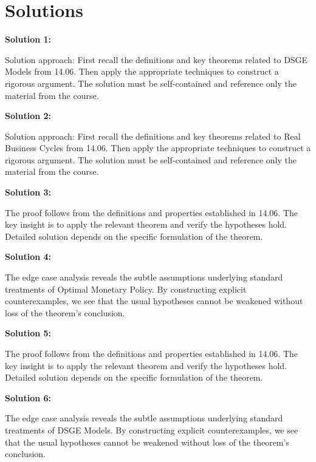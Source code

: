 \documentclass[12pt,a4paper]{exam}
\begin{document}
\newpage
\section*{Solutions}

\textbf{Solution 1:}

Solution approach: First recall the definitions and key theorems related to DSGE Models from 14.06. Then apply the appropriate techniques to construct a rigorous argument. The solution must be self-contained and reference only the material from the course.

\vspace{0.5cm}

\textbf{Solution 2:}

Solution approach: First recall the definitions and key theorems related to Real Business Cycles from 14.06. Then apply the appropriate techniques to construct a rigorous argument. The solution must be self-contained and reference only the material from the course.

\vspace{0.5cm}

\textbf{Solution 3:}

The proof follows from the definitions and properties established in 14.06. The key insight is to apply the relevant theorem and verify the hypotheses hold. Detailed solution depends on the specific formulation of the theorem.

\vspace{0.5cm}

\textbf{Solution 4:}

The edge case analysis reveals the subtle assumptions underlying standard treatments of Optimal Monetary Policy. By constructing explicit counterexamples, we see that the usual hypotheses cannot be weakened without loss of the theorem's conclusion.

\vspace{0.5cm}

\textbf{Solution 5:}

The proof follows from the definitions and properties established in 14.06. The key insight is to apply the relevant theorem and verify the hypotheses hold. Detailed solution depends on the specific formulation of the theorem.

\vspace{0.5cm}

\textbf{Solution 6:}

The edge case analysis reveals the subtle assumptions underlying standard treatments of DSGE Models. By constructing explicit counterexamples, we see that the usual hypotheses cannot be weakened without loss of the theorem's conclusion.
\end{document}
